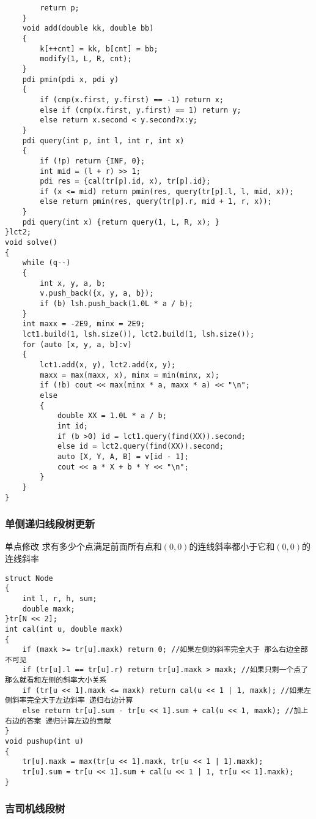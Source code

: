 \documentclass[a4paper, fontset=none]{ctexart}
\begin{document}
\begin{verbatim}
        return p;
    }
    void add(double kk, double bb)
    {
        k[++cnt] = kk, b[cnt] = bb;
        modify(1, L, R, cnt);
    }
    pdi pmin(pdi x, pdi y)
    {
        if (cmp(x.first, y.first) == -1) return x;
        else if (cmp(x.first, y.first) == 1) return y;
        else return x.second < y.second?x:y;
    }
    pdi query(int p, int l, int r, int x)
    {
        if (!p) return {INF, 0};
        int mid = (l + r) >> 1;
        pdi res = {cal(tr[p].id, x), tr[p].id};
        if (x <= mid) return pmin(res, query(tr[p].l, l, mid, x));
        else return pmin(res, query(tr[p].r, mid + 1, r, x));
    }
    pdi query(int x) {return query(1, L, R, x); }
}lct2;
void solve()
{
    while (q--)
    {
        int x, y, a, b;
        v.push_back({x, y, a, b});
        if (b) lsh.push_back(1.0L * a / b);
    }
    int maxx = -2E9, minx = 2E9;
    lct1.build(1, lsh.size()), lct2.build(1, lsh.size());
    for (auto [x, y, a, b]:v)
    {
        lct1.add(x, y), lct2.add(x, y);
        maxx = max(maxx, x), minx = min(minx, x);
        if (!b) cout << max(minx * a, maxx * a) << "\n";
        else
        {
            double XX = 1.0L * a / b;
            int id;
            if (b >0) id = lct1.query(find(XX)).second;
            else id = lct2.query(find(XX)).second;
            auto [X, Y, A, B] = v[id - 1];
            cout << a * X + b * Y << "\n";
        }
    }
}
\end{verbatim}
\subsubsection{单侧递归线段树更新}
单点修改 \quad 求有多少个点满足前面所有点和$(0, 0)$的连线斜率都小于它和$(0, 0)$的连线斜率

\begin{verbatim}
struct Node
{
    int l, r, h, sum;
    double maxk;
}tr[N << 2];
int cal(int u, double maxk)
{
    if (maxk >= tr[u].maxk) return 0; //如果左侧的斜率完全大于 那么右边全部不可见
    if (tr[u].l == tr[u].r) return tr[u].maxk > maxk; //如果只剩一个点了 那么就看和左侧的斜率大小关系
    if (tr[u << 1].maxk <= maxk) return cal(u << 1 | 1, maxk); //如果左侧斜率完全大于左边斜率 递归右边计算
    else return tr[u].sum - tr[u << 1].sum + cal(u << 1, maxk); //加上右边的答案 递归计算左边的贡献
}
void pushup(int u)
{
    tr[u].maxk = max(tr[u << 1].maxk, tr[u << 1 | 1].maxk);
    tr[u].sum = tr[u << 1].sum + cal(u << 1 | 1, tr[u << 1].maxk);
}
\end{verbatim}
\subsubsection{吉司机线段树}
\end{document}

